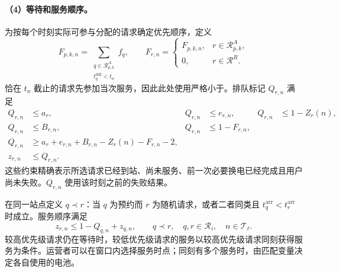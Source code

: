 \documentclass[12pt,a4paper,UTF8]{ctexart}
\numberwithin{equation}{section}
\newcommand{\R}{\mathcal R}
\begin{document}
\paragraph{（4）等待和服务顺序。}
为按每个时刻实际可参与分配的请求确定优先顺序，定义
\begin{equation}
F_{p,k,n}=\sum_{\substack{q\in\R_{p,k}^A\\t_q^{\mathrm{ddl}}<t_n}}f_q,
\qquad
F_{r,n}=\begin{cases}F_{p,k,n},&r\in\R_{p,k}^A,\\0,&r\in\R^R.\end{cases}
\label{eq:failure_before_time}
\end{equation}
恰在 $t_n$ 截止的请求先参加当次服务，因此此处使用严格小于。排队标记 $Q_{r,n}$ 满足
\begin{equation}
\begin{aligned}
Q_{r,n}&\le a_r,& Q_{r,n}&\le e_{r,n},&
Q_{r,n}&\le1-Z_r(n),\\
Q_{r,n}&\le B_{r,n},& Q_{r,n}&\le1-F_{r,n},\\
Q_{r,n}&\ge a_r+e_{r,n}+B_{r,n}-Z_r(n)-F_{r,n}-2,\\
z_{r,n}&\le Q_{r,n}.
\end{aligned}
\label{eq:queue}
\end{equation}
这些约束精确表示所选请求已经到站、尚未服务、前一次必要换电已经完成且用户尚未失败。$Q_{r,n}$ 使用该时刻之前的失败结果。

在同一站点定义 $q\prec r$：当 $q$ 为预约而 $r$ 为随机请求，或者二者同类且 $t_q^{\mathrm{arr}}<t_r^{\mathrm{arr}}$ 时成立。服务顺序满足
\begin{equation}
z_{r,n}\le 1-Q_{q,n}+z_{q,n},
\qquad q\prec r,\quad q,r\in\R_i,\quad n\in\mathcal T_\ell.
\label{eq:priority}
\end{equation}
较高优先级请求仍在等待时，较低优先级请求的服务以较高优先级请求同刻获得服务为条件。运营者可以在窗口内选择服务时点；同刻有多个服务时，由匹配变量决定各自使用的电池。
\end{document}
